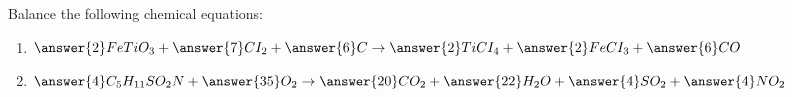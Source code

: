 \documentclass{ximera}
\author{Zack Reed}
\begin{document}
\begin{exercise}

Balance the following chemical equations:

\begin{enumerate}

    \item $\answer{2}FeTiO_3+\answer{7}CI_2+\answer{6}C\rightarrow \answer{2}TiCI_4+\answer{2}FeCI_3+\answer{6}CO$

    
    
    \item $\answer{4}C_5H_{11}SO_2N+\answer{35}O_2\rightarrow \answer{20}CO_2+\answer{22}H_2O+\answer{4}SO_2+\answer{4}NO_2$

\end{enumerate}

\end{exercise}
\end{document}
